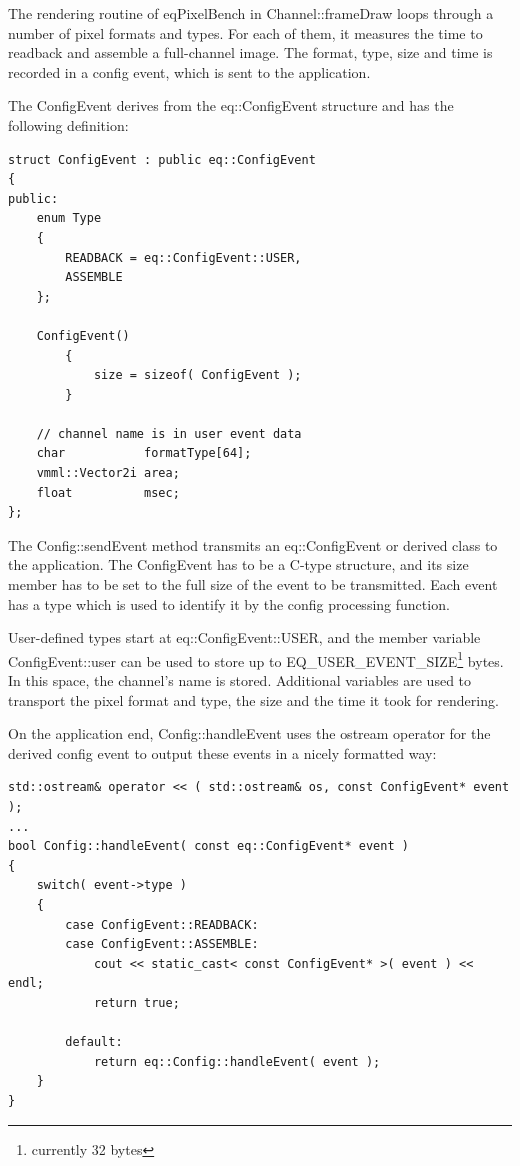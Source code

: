 \documentclass[10pt,a4]{scrartcl}
\begin{document}
The rendering routine of \textsf{eqPixelBench} in
\textsf{Channel::frameDraw} loops through a number of pixel formats and
types. For each of them, it measures the time to readback and assemble a
full-channel image. The format, type, size and time is recorded in a
config event, which is sent to the application.

The \textsf{ConfigEvent} derives from the \textsf{eq::ConfigEvent}
structure and has the following definition:

{\footnotesize\begin{lstlisting}
struct ConfigEvent : public eq::ConfigEvent
{
public:
    enum Type
    {
        READBACK = eq::ConfigEvent::USER,
        ASSEMBLE
    };

    ConfigEvent()
        {
            size = sizeof( ConfigEvent );
        }

    // channel name is in user event data
    char           formatType[64];
    vmml::Vector2i area;
    float          msec;
};
\end{lstlisting}}

The \textsf{Config::sendEvent} method transmits an
\textsf{eq::ConfigEvent} or derived class to the application. The
ConfigEvent has to be a C-type structure, and its \textsf{size}
member has to be set to the full size of the event to be transmitted.
Each event has a type which is used to identify it by the config 
processing function.

User-defined types start at \textsf{eq::ConfigEvent::USER}, and the
member variable \textsf{ConfigEvent::user} can be used to store up to
\textsf{EQ\_USER\_EVENT\_SIZE}\footnote{currently 32 bytes} bytes. In
this space, the channel's name is stored. Additional variables are used
to transport the pixel format and type, the size and the time it took
for rendering.

On the application end, \textsf{Config::handleEvent} uses the
\textsf{ostream} operator for the derived config event to output these
events in a nicely formatted way:

{\footnotesize\begin{lstlisting}
std::ostream& operator << ( std::ostream& os, const ConfigEvent* event );
...
bool Config::handleEvent( const eq::ConfigEvent* event )
{
    switch( event->type )
    {
        case ConfigEvent::READBACK:
        case ConfigEvent::ASSEMBLE:
            cout << static_cast< const ConfigEvent* >( event ) << endl;
            return true;

        default:
            return eq::Config::handleEvent( event );
    }
}
\end{lstlisting}}%
\end{document}
